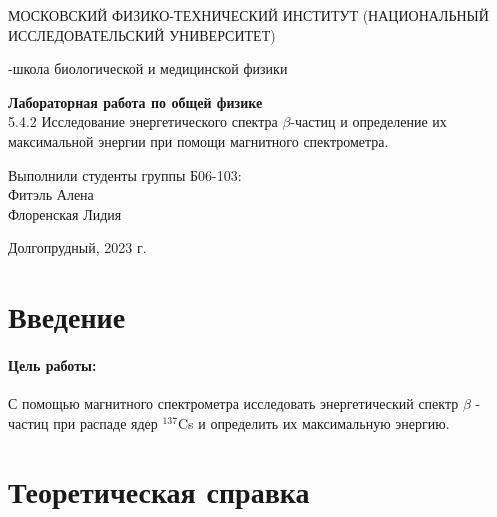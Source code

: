 \documentclass{article}
\begin{document}
\def\figurename{Рисунок}
\begin{titlepage}
\begin{center}
    {\large МОСКОВСКИЙ ФИЗИКО-ТЕХНИЧЕСКИЙ ИНСТИТУТ (НАЦИОНАЛЬНЫЙ ИССЛЕДОВАТЕЛЬСКИЙ УНИВЕРСИТЕТ)}
\end{center}
\begin{center}
    {-школа биологической и медицинской физики}
\end{center}

\vspace{1cm}
{\huge
\begin{center}
    {\bf Лабораторная работа по общей физике}\\
    \vspace{0.5cm}
    5.4.2 Исследование энергетического спектра $\beta$-частиц и определение их максимальной энергии при помощи магнитного спектрометра.
\end{center}
}

\vspace{4cm}
\begin{flushright}
{\LARGE Выполнили студенты группы Б06-103:\\ Фитэль Алена \\Флоренская Лидия\\}

\end{flushright}
\vspace{9cm}
\begin{center}
    Долгопрудный, 2023 г.
\end{center}
\end{titlepage}








\newpage
\section{Введение}
\paragraph*{Цель работы:} С помощью магнитного спектрометра исследовать энергетический спектр $\beta$ - частиц при распаде ядер $^{137}$Cs  и определить их максимальную энергию.
\section{Теоретическая справка}
\end{document}
